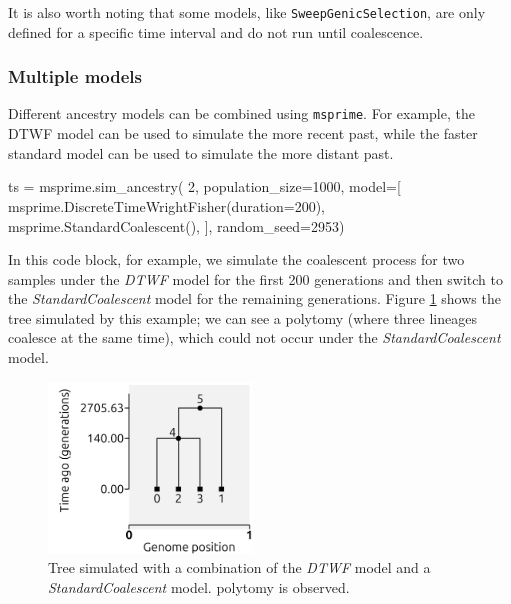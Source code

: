 \documentclass[graybox]{svmult}
\newcommand{\msprime}[0]{\texttt{msprime}}
\begin{document}
It is also worth noting that some models, like \texttt{SweepGenicSelection}, are only defined for a specific time interval and do not run until coalescence.

\subsubsection{Multiple models}\label{multiple-models}

Different ancestry models can be combined using \msprime. For example, the DTWF model can be used to simulate the more recent
past, while the faster standard model can be used to simulate the more distant past.

\begin{pythoncode}
ts = msprime.sim_ancestry(
    2, population_size=1000,
    model=[
        msprime.DiscreteTimeWrightFisher(duration=200),
        msprime.StandardCoalescent(),
    ],
    random_seed=2953)
\end{pythoncode}

In this code block, for example, we simulate the coalescent process for two samples under the \emph{DTWF} model for the first 200 generations
and then switch to the \emph{StandardCoalescent} model for the remaining generations. Figure \ref{fig:polytomy} shows the tree
simulated by this example; we can see a polytomy (where three lineages coalesce at the same time), which could not occur under the
\emph{StandardCoalescent} model.

\begin{figure}
\begin{center}
\includegraphics[width=0.48\textwidth]{images/polytomy.pdf}
\end{center}
\caption{\label{fig:polytomy} Tree simulated with a combination of the \emph{DTWF} model and a \emph{StandardCoalescent} model. polytomy is observed.}
\end{figure}

\
\end{document}
